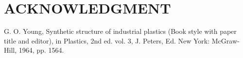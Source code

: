 \documentclass[letterpaper, 10 pt, conference]{ieeeconf}  %
\begin{document}
\lipsum[1]

\section*{ACKNOWLEDGMENT}

\lipsum[1]


\begin{thebibliography}{99}

 G. O. Young, Synthetic structure of industrial plastics (Book style with paper title and editor), in Plastics, 2nd ed. vol. 3, J. Peters, Ed.  New York: McGraw-Hill, 1964, pp. 1564.

\end{thebibliography}
\end{document}
